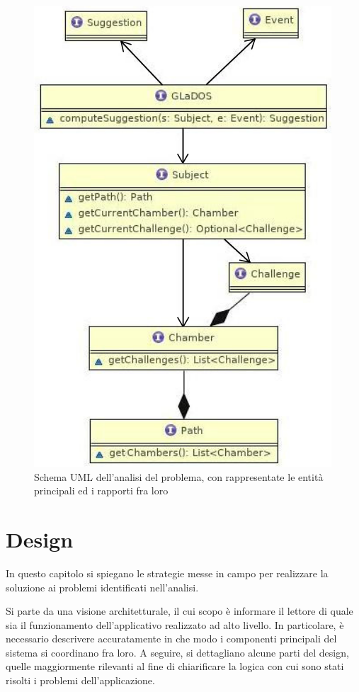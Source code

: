 \documentclass[a4paper,12pt]{report}
\begin{document}
\begin{figure}
\centering{}
\includegraphics{img/analysis}
\caption{Schema UML dell'analisi del problema, con rappresentate le entità principali ed i rapporti fra loro}
\label{img:analysis}
\end{figure}

\chapter{Design}

In questo capitolo si spiegano le strategie messe in campo per realizzare la soluzione ai problemi identificati nell'analisi.

Si parte da una visione architetturale, il cui scopo è informare il lettore di quale sia il funzionamento dell'applicativo realizzato ad alto livello.
%
In particolare, è necessario descrivere accuratamente in che modo i componenti principali del sistema si coordinano fra loro.
%
A seguire, si dettagliano alcune parti del design, quelle maggiormente rilevanti al fine di chiarificare la logica con cui sono stati risolti i problemi dell'applicazione.
\end{document}
